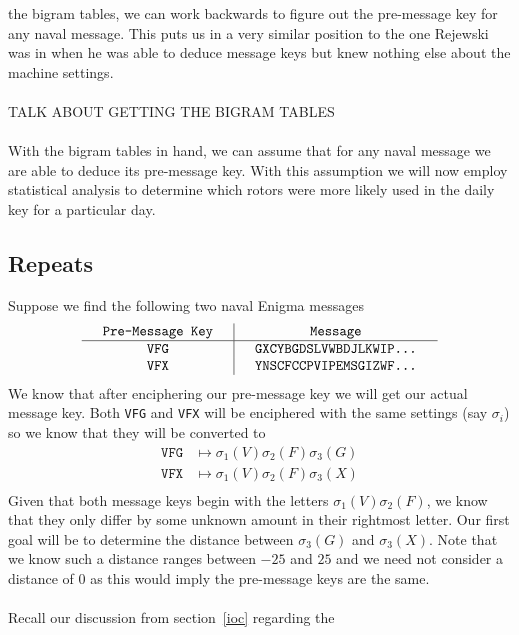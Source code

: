   the bigram tables, we can work backwards to figure out the
  pre-message key for any naval message. This puts us in a very
  similar position to the one Rejewski was in when he was able to
  deduce message keys but knew nothing else about the machine settings.
  \\\\TALK ABOUT GETTING THE BIGRAM TABLES
  \\\\With the bigram tables in hand, we can assume that for any
  naval message we are able to deduce its pre-message key. With this
  assumption we will now employ statistical analysis to determine
  which rotors were more likely used in the daily key for a particular day.

  \subsection{Repeats}
  Suppose we find the following two naval Enigma messages
  \[
    \setlength{\arraycolsep}{15pt}
    \begin{array}{c | c}
      \texttt{Pre-Message Key} & \texttt{Message}                \\
      \hline
      \texttt{VFG}             & \texttt{GXCYBGDSLVWBDJLKWIP...} \\
      \texttt{VFX}             & \texttt{YNSCFCCPVIPEMSGIZWF...} \\
    \end{array}
  \]
  We know that after enciphering our pre-message key we will get our
  actual message key. Both \texttt{VFG} and \texttt{VFX} will be
  enciphered with the same settings (say $\sigma_i$) so we know that
  they will be converted to
  \begin{align*}
    \texttt{VFG} & \mapsto \sigma_1(V)\sigma_2(F)\sigma_3(G) \\
    \texttt{VFX} & \mapsto \sigma_1(V)\sigma_2(F)\sigma_3(X) \\
  \end{align*}
  Given that both message keys begin with the letters
  $\sigma_1(V)\sigma_2(F)$, we know that they only differ by some
  unknown amount in their rightmost letter. Our first goal will be to
  determine the distance between $\sigma_3(G)$ and $\sigma_3(X)$.
  Note that we know such a distance ranges between $-25$ and $25$ and
  we need not consider a distance of $0$ as this would imply the
  pre-message keys are the same.
  \\\\Recall our discussion from section~\ref{ioc} regarding the
